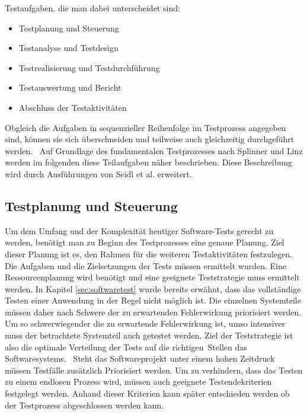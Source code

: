 Testaufgaben, die man dabei unterscheidet sind:

\begin{itemize}
	  \itemsep0pt
      \item Testplanung und Steuerung
      \item Testanalyse und Testdesign
      \item Testrealisierung und Testdurchführung
      \item Testauswertung und Bericht
      \item Abschluss der Testaktivitäten       
\end{itemize}

\glqq Obgleich die Aufgaben in sequenzieller Reihenfolge im Testprozess angegeben sind, können sie sich überschneiden und teilweise auch gleichzeitig durchgeführt werden.\grqq\ \cite[S.19]{spillner_basiswissen_2007} Auf Grundlage des fundamentalen Testprozesses nach Splinner und Linz werden im folgenden diese Teilaufgaben näher beschrieben. \cite[S.20ff]{spillner_basiswissen_2007}
Diese Beschreibung wird durch Ausführungen von Seidl et al. erweitert. \cite[Seite 9 ff.]{seidl_basiswissen_2012}

\subsection{Testplanung und Steuerung}
\label{subsec:testplanung_und_steuerung}
Um dem Umfang und der Komplexität heutiger Software-Tests gerecht zu werden, benötigt man zu Beginn des Testprozesses eine genaue Planung.
Ziel dieser Planung ist es, den Rahmen für die weiteren Testaktivitäten festzulegen. Die Aufgaben und die Zielsetzungen der Tests müssen ermittelt wurden. Eine Ressourcenplanung wird benötigt und eine geeignete Teststrategie muss ermittelt werden. In Kapitel \ref{sec:softwaretest} wurde bereits erwähnt, dass das vollständige Testen einer Anwendung in der Regel nicht möglich ist. Die einzelnen Systemteile müssen daher nach Schwere der zu erwartenden Fehlerwirkung priorisiert werden. Um so schwerwiegender die zu erwartende Fehlerwirkung ist, umso intensiver muss der betrachtete Systemteil auch getestet werden. Ziel der Teststrategie ist also \glqq die optimale Verteilung der Tests auf die \frqq richtigen\flqq\ Stellen das Softwaresystems.\grqq\ \cite[S.21]{spillner_basiswissen_2007} Steht das Softwareprojekt unter einem hohen Zeitdruck müssen Testfälle zusätzlich Priorisiert werden.
Um zu verhindern, dass das Testen zu einem endlosen Prozess wird, müssen auch geeignete Testendekriterien festgelegt werden. Anhand dieser Kriterien kann später entschieden werden ob der Testprozess abgeschlossen werden kann.

